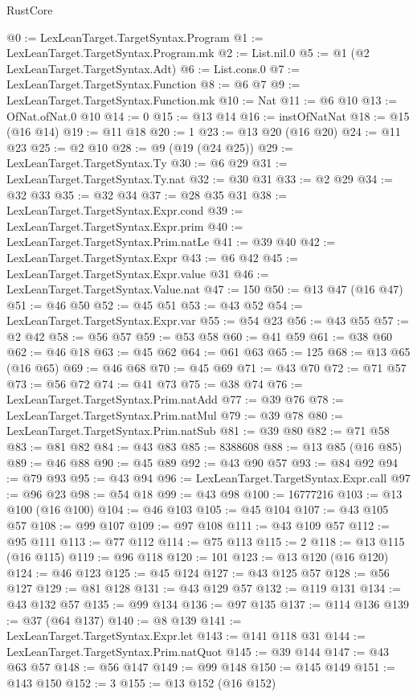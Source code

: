 \begin{lexlean}{RustCore}
\begin{coremodule}
@0 := LexLeanTarget.TargetSyntax.Program
@1 := LexLeanTarget.TargetSyntax.Program.mk
@2 := List.nil.{0}
@5 := @1 (@2 LexLeanTarget.TargetSyntax.Adt)
@6 := List.cons.{0}
@7 := LexLeanTarget.TargetSyntax.Function
@8 := @6 @7
@9 := LexLeanTarget.TargetSyntax.Function.mk
@10 := Nat
@11 := @6 @10
@13 := OfNat.ofNat.{0} @10
@14 := 0
@15 := @13 @14
@16 := instOfNatNat
@18 := @15 (@16 @14)
@19 := @11 @18
@20 := 1
@23 := @13 @20 (@16 @20)
@24 := @11 @23
@25 := @2 @10
@28 := @9 (@19 (@24 @25))
@29 := LexLeanTarget.TargetSyntax.Ty
@30 := @6 @29
@31 := LexLeanTarget.TargetSyntax.Ty.nat
@32 := @30 @31
@33 := @2 @29
@34 := @32 @33
@35 := @32 @34
@37 := @28 @35 @31
@38 := LexLeanTarget.TargetSyntax.Expr.cond
@39 := LexLeanTarget.TargetSyntax.Expr.prim
@40 := LexLeanTarget.TargetSyntax.Prim.natLe
@41 := @39 @40
@42 := LexLeanTarget.TargetSyntax.Expr
@43 := @6 @42
@45 := LexLeanTarget.TargetSyntax.Expr.value @31
@46 := LexLeanTarget.TargetSyntax.Value.nat
@47 := 150
@50 := @13 @47 (@16 @47)
@51 := @46 @50
@52 := @45 @51
@53 := @43 @52
@54 := LexLeanTarget.TargetSyntax.Expr.var
@55 := @54 @23
@56 := @43 @55
@57 := @2 @42
@58 := @56 @57
@59 := @53 @58
@60 := @41 @59
@61 := @38 @60
@62 := @46 @18
@63 := @45 @62
@64 := @61 @63
@65 := 125
@68 := @13 @65 (@16 @65)
@69 := @46 @68
@70 := @45 @69
@71 := @43 @70
@72 := @71 @57
@73 := @56 @72
@74 := @41 @73
@75 := @38 @74
@76 := LexLeanTarget.TargetSyntax.Prim.natAdd
@77 := @39 @76
@78 := LexLeanTarget.TargetSyntax.Prim.natMul
@79 := @39 @78
@80 := LexLeanTarget.TargetSyntax.Prim.natSub
@81 := @39 @80
@82 := @71 @58
@83 := @81 @82
@84 := @43 @83
@85 := 8388608
@88 := @13 @85 (@16 @85)
@89 := @46 @88
@90 := @45 @89
@92 := @43 @90 @57
@93 := @84 @92
@94 := @79 @93
@95 := @43 @94
@96 := LexLeanTarget.TargetSyntax.Expr.call
@97 := @96 @23
@98 := @54 @18
@99 := @43 @98
@100 := 16777216
@103 := @13 @100 (@16 @100)
@104 := @46 @103
@105 := @45 @104
@107 := @43 @105 @57
@108 := @99 @107
@109 := @97 @108
@111 := @43 @109 @57
@112 := @95 @111
@113 := @77 @112
@114 := @75 @113
@115 := 2
@118 := @13 @115 (@16 @115)
@119 := @96 @118
@120 := 101
@123 := @13 @120 (@16 @120)
@124 := @46 @123
@125 := @45 @124
@127 := @43 @125 @57
@128 := @56 @127
@129 := @81 @128
@131 := @43 @129 @57
@132 := @119 @131
@134 := @43 @132 @57
@135 := @99 @134
@136 := @97 @135
@137 := @114 @136
@139 := @37 (@64 @137)
@140 := @8 @139
@141 := LexLeanTarget.TargetSyntax.Expr.let
@143 := @141 @118 @31
@144 := LexLeanTarget.TargetSyntax.Prim.natQuot
@145 := @39 @144
@147 := @43 @63 @57
@148 := @56 @147
@149 := @99 @148
@150 := @145 @149
@151 := @143 @150
@152 := 3
@155 := @13 @152 (@16 @152)

\end{coremodule}
\end{lexlean}
